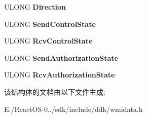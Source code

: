 \begin{DoxyCompactItemize}
U\+L\+O\+NG {\bfseries Direction}
\item 
\mbox{\label{struct___m_s_ndis___port_char_a9576a14bc1542afdb5e342b8dccf7da2}} 
U\+L\+O\+NG {\bfseries Send\+Control\+State}
\item 
\mbox{\label{struct___m_s_ndis___port_char_a0e868b58e0eaca1b66f9ba87ca3a3993}} 
U\+L\+O\+NG {\bfseries Rcv\+Control\+State}
\item 
\mbox{\label{struct___m_s_ndis___port_char_a6c6cce2c11adfeac4cf1be4061d38b7e}} 
U\+L\+O\+NG {\bfseries Send\+Authorization\+State}
\item 
\mbox{\label{struct___m_s_ndis___port_char_abaf2a771a4c5089ae8b54f76776ae6be}} 
U\+L\+O\+NG {\bfseries Rcv\+Authorization\+State}
\end{DoxyCompactItemize}


该结构体的文档由以下文件生成\+:\begin{DoxyCompactItemize}
\item 
E\+:/\+React\+O\+S-\/0../sdk/include/ddk/wmidata.\+h\end{DoxyCompactItemize}

